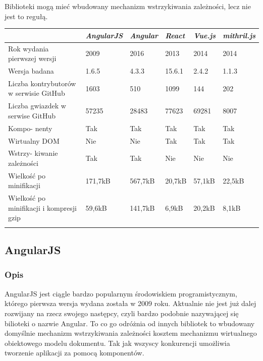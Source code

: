 \documentclass[polish, twoside, 12pt]{mwart}
\begin{document}
Biblioteki mogą mieć wbudowany mechanizm wstrzykiwania zależności, lecz nie jest to regułą. \newline


\begin{center}
  \begin{tabularx}{\textwidth}{|X|X|X|X|X|X|}\hline
    & \emph{AngularJS} & \emph{Angular} & \emph{React} & \emph{Vue.js} & \emph{mithril.js}\\ \hline
    Rok wydania pierwszej wersji & 2009 & 2016 & 2013 & 2014 & 2014 \\ \hline
    Wersja badana & 1.6.5 & 4.3.3 & 15.6.1 & 2.4.2 & 1.1.3 \\ \hline
    Liczba kontrybutorów w serwisie GitHub & 1603 & 510 & 1099 & 144 & 202 \\ \hline
    Liczba gwiazdek w serwise GitHub & 57235 & 28483 & 77623 & 69281 & 8007 \\ \hline
    Kompo- nenty & Tak & Tak & Tak & Tak & Tak \\ \hline
    Wirtualny DOM & Nie & Nie & Tak & Tak & Tak \\ \hline
    Wstrzy- kiwanie zależności & Tak & Tak & Nie & Nie & Nie \\ \hline
    Wielkość po minifikacji & 171,7kB & 567,7kB & 20,7kB & 57,1kB & 22,5kB \\ \hline
    Wielkość po minifikacji i kompresji gzip & 59,6kB & 141,7kB & 6,9kB & 20,2kB & 8,1kB \\ \hline
    \caption{Porównanie bibliotek}
    \label{tab:frameworks-comparison}
  \end{tabularx}
\end{center}

\subsection{AngularJS}

\subsubsection{Opis}

AngularJS \cite{angularjs} jest ciągle bardzo popularnym środowiskiem programistycznym, którego pierwsza wersja wydana została w 2009 roku. Aktualnie nie jest już dalej rozwijany na rzecz swojego następcy, czyli bardzo podobnie nazywającej się bilioteki o nazwie Angular. To co go odróżnia od innych bibliotek to wbudowany domyślnie mechanizm wstrzykiwania zależności kosztem mechanizmu wirtualnego obiektowego modelu dokumentu. Tak jak wszyscy konkurencji umożliwia tworzenie aplikacji za pomocą komponentów.
\end{document}
